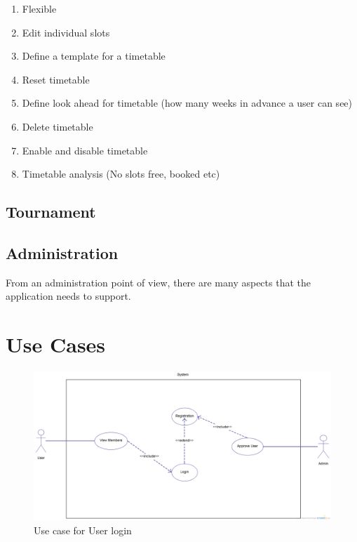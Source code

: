 \begin{enumerate}
\item Flexible 
\item Edit individual slots
\item Define a template for a timetable
\item Reset timetable
\item Define look ahead for timetable (how many weeks in advance a user can see)
\item Delete timetable
\item Enable and disable timetable
\item Timetable analysis (No slots free, booked etc)
\end{enumerate}

\subsection{Tournament}

\subsection{Administration}

From an administration point of view, there are many aspects that the application needs to support. 

\section{Use Cases}

\begin{figure}[H]
\begin{center}
\includegraphics[width=14cm]{usecaselogin.png}
\end{center}
\caption{Use case for User login}
\label{fig:usecaselogin}
\end{figure}

